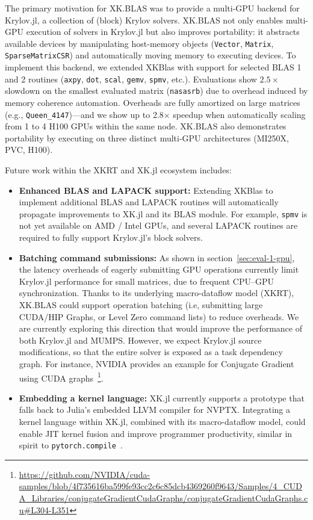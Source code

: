 \documentclass{juliacon}
\begin{document}
The primary motivation for XK.BLAS was to provide a multi-GPU backend for Krylov.jl, a collection of (block) Krylov solvers.  
XK.BLAS not only enables multi-GPU execution of solvers in Krylov.jl but also improves portability: it abstracts available devices by manipulating host-memory objects (\texttt{Vector}, \texttt{Matrix}, \texttt{SparseMatrixCSR}) and automatically moving memory to executing devices.
To implement this backend, we extended XKBlas with support for selected BLAS 1 and 2 routines (\texttt{axpy}, \texttt{dot}, \texttt{scal}, \texttt{gemv}, \texttt{spmv}, etc.).
Evaluations show $2.5\times$ slowdown on the smallest evaluated matrix (\texttt{nasasrb}) due to overhead induced by memory coherence automation.
Overheads are fully amortized on large matrices (e.g., \texttt{Queen\_4147})---and we show up to 2.8× speedup when automatically scaling from 1 to 4 H100 GPUs within the same node.
XK.BLAS also demonstrates portability by executing on three distinct multi-GPU architectures (MI250X, PVC, H100).

Future work within the XKRT and XK.jl ecosystem includes:
\begin{itemize}
    \item[$\bullet$] \textbf{Enhanced BLAS and LAPACK support:} Extending XKBlas to implement additional BLAS and LAPACK routines will automatically propagate improvements to XK.jl and its BLAS module.
    For example, \texttt{spmv} is not yet available on AMD / Intel GPUs, and several LAPACK routines are required to fully support Krylov.jl’s block solvers.  
    \item[$\bullet$] \textbf{Batching command submissions:} As shown in section~\ref{sec:eval-1-gpu}, the latency overheads of eagerly submitting GPU operations currently limit Krylov.jl performance for small matrices, due to frequent CPU–GPU synchronization.
    Thanks to its underlying macro-dataflow model (XKRT), XK.BLAS could support operation batching (i.e, submitting large CUDA/HIP Graphs, or Level Zero command lists) to reduce overheads. We are currently exploring this direction that would improve the performance of both Krylov.jl and MUMPS.
    However, we expect Krylov.jl source modifications, so that the entire solver is exposed as a task dependency graph. For instance, NVIDIA provides an example for Conjugate Gradient using CUDA graphs~\footnote{\url{https://github.com/NVIDIA/cuda-samples/blob/4f735616ba599fe93cc2c6c85dcb4369260f9643/Samples/4_CUDA_Libraries/conjugateGradientCudaGraphs/conjugateGradientCudaGraphs.cu\#L304-L351}}.
    \item[$\bullet$] \textbf{Embedding a kernel language:} XK.jl currently supports a prototype that falls back to Julia’s embedded LLVM compiler for NVPTX. Integrating a kernel language within XK.jl, combined with its macro-dataflow model, could enable JIT kernel fusion and improve programmer productivity, similar in spirit to \texttt{pytorch.compile}~\cite{pytorch-compile}.
\end{itemize}
\end{document}
